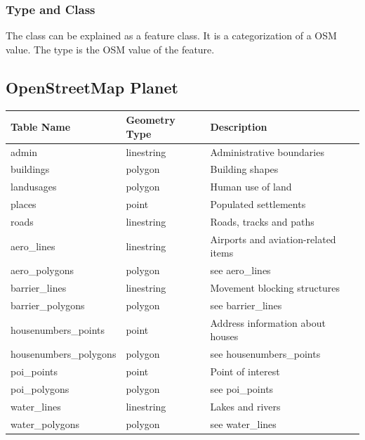 \subsubsection{Type and Class}

The class can be explained as a feature class. It is a categorization of a OSM value.
The type is the OSM value of the feature.


\subsection{OpenStreetMap Planet}

\begin{flushleft}
    \begin{tabular}{lll}
    \hline
    Table Name            & Geometry Type & Description \\
    \hline                                          
    admin                  & linestring    & Administrative boundaries \\
    buildings              & polygon       & Building shapes                            \\
    landusages             & polygon       & Human use of land \\
    places                 & point         & Populated settlements                      \\
    roads                  & linestring    & Roads, tracks and paths          \\
    aero\_lines            & linestring    & Airports and aviation-related items        \\
    aero\_polygons         & polygon       & see aero\_lines                            \\
    barrier\_lines         & linestring    & Movement blocking structures   \\
    barrier\_polygons      & polygon       & see barrier\_lines                         \\
    housenumbers\_points   & point         & Address information about houses \\
    housenumbers\_polygons & polygon       & see housenumbers\_points                   \\
    poi\_points            & point         & Point of interest                          \\
    poi\_polygons          & polygon       & see poi\_points                            \\
    water\_lines           & linestring    & Lakes and rivers                           \\
    water\_polygons        & polygon       & see water\_lines                           \\
    \end{tabular}
\end{flushleft}


